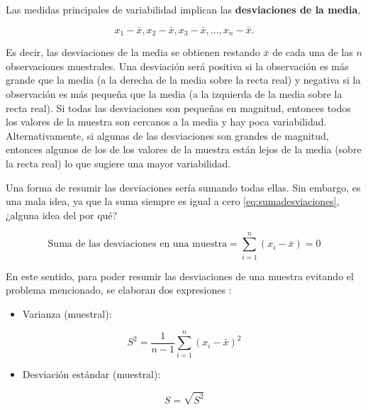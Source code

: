 \documentclass[
]{book}
\providecommand{\tightlist}{%
  \setlength{\itemsep}{0pt}\setlength{\parskip}{0pt}}
\begin{document}
Las medidas principales de variabilidad implican las \textbf{desviaciones de la media},

\begin{equation}
x_1 - \bar{x}, x_2 - \bar{x}, x_3 - \bar{x}, \ldots, x_n - \bar{x}.
\label{eq:desviaciones}
\end{equation}

Es decir, las desviaciones de la media se obtienen restando \(\bar{x}\) de cada una de las \(n\) observaciones muestrales. Una desviación será positiva si la observación es más grande que la media (a la derecha de la media sobre la recta real) y negativa si la observación es más pequeña que la media (a la izquierda de la media sobre la recta real). Si todas las desviaciones son pequeñas en magnitud, entonces todos los valores de la muestra son cercanos a la media y hay poca variabilidad. Alternativamente, si algunas de las desviaciones son grandes de magnitud, entonces algunos de los de los valores de la muestra están lejos de la media (sobre la recta real) lo que sugiere una mayor variabilidad.

Una forma de resumir las desviaciones sería sumando todas ellas. Sin embargo, es una mala idea, ya que la suma siempre es igual a cero \eqref{eq:sumadesviaciones}, ¿alguna idea del por qué?

\begin{equation}
\text{Suma de las desviaciones en una muestra} = \sum_{i=1}^{n}(x_i-\bar{x}) = 0
\label{eq:sumadesviaciones}
\end{equation}

En este sentido, para poder resumir las desviaciones de una muestra evitando el problema mencionado, se elaboran dos expresiones \citep[página 32]{Devore}:

\begin{itemize}
\tightlist
\item
  Varianza (muestral):
\end{itemize}

\begin{equation}
S^2= \frac{1}{n-1}\sum_{i=1}^{n}(x_i-\bar{x})^2
\label{eq:varianzamuestral}
\end{equation}

\begin{itemize}
\tightlist
\item
  Desviación estándar (muestral):
\end{itemize}

\begin{equation}
S = \sqrt{S^2}
\label{eq:demuestral}
\end{equation}
\end{document}
